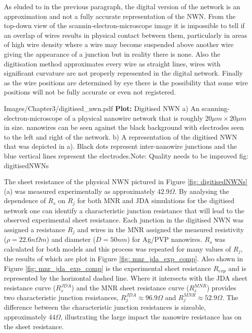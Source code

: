 As eluded to in the previous paragraph, the digital version of the network is an approximation and not a fully accurate representation of the NWN. From the top-down view of the scannin-electron-microscope image it is impossible to tell if an overlap of wires results in physical contact between them, particularly in areas of high wire density where a wire may become suspended above another wire giving the appearance of a junction but in reality there is none. Also the digitisation method approximates every wire as straight lines, wires with significant curvature are not properly represented in the digital network. Finally as the wire positions are determined by eye there is the possibility that some wire positions will not be fully accurate or even not registered.

{Images/Chapter3/digitised_nwn.pdf}
{\textbf{Plot:} Digitised NWN}
{ a) An scanning-electron-microscope of a physical nanowire network that is roughly $20 \mu m \times 20 \mu m$ in size. nanowires can be seen against the black background with electrodes seen to the left and right of the network. b) A representation of the digitised NWN that was depicted in a). Black dots represent inter-nanowire junctions and the blue vertical lines represent the electrodes.Note: Quality needs to be improved}
{fig: digitisedNWNs}

The sheet resistance of the physical NWN pictured in Figure \ref{fig: digitisedNWNs}(a) was measured experimentally as approximately $42.9 \Omega$. By analysing the dependence of $R_s$ on $R_j$ for both MNR and JDA simulations for the digitised network one can identify a characteristic junction resistance that will lead to the observed experimental sheet resistance. Each junction in the digitised NWN was assigned a resistance $R_j$ and wires in the MNR assigned the measured resistivity ($\rho = 22.6 n \Omega m$) and diameter ($D = 50 nm$) for Ag/PVP nanowires. $R_s$ was calculated for both models and this process was repeated for many values of $R_j$, the results of which are plot in Figure \ref{fig: mnr_jda_exp_comp}. Also shown in Figure \ref{fig: mnr_jda_exp_comp} is the experimental sheet resistance $R_{exp}$ and is represented by the horizontal dashed line. Where it intersects with the JDA sheet resistance curve ($R_s^{JDA}$) and the MNR sheet resistance curve ($R_s^{MNR}$) provides two characteristic junction resistances, $R_j^{JDA} \approx 96.9 \Omega$ and $R_j^{MNR} \approx 52.9 \Omega$. The difference between the characteristic junction resistances is sizeable, approximately $44\Omega$, illustrating the large impact the nanowire resistance has on the sheet resistance.

